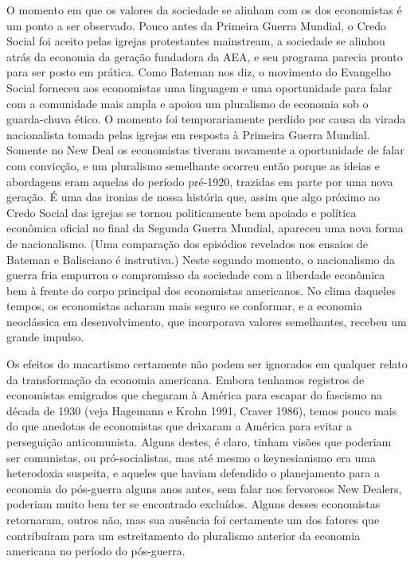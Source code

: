 \documentclass[a4paper,12pt]{article}[abntex2]
\begin{document}
O momento em que os valores da sociedade se alinham com os dos economistas é um ponto a ser observado. Pouco antes da Primeira Guerra Mundial, o Credo Social foi aceito pelas igrejas protestantes mainstream, a sociedade se alinhou atrás da economia da geração fundadora da AEA, e seu programa parecia pronto para ser posto em prática. Como Bateman nos diz, o movimento do Evangelho Social forneceu aos economistas uma linguagem e uma oportunidade para falar com a comunidade mais ampla e apoiou um pluralismo de economia sob o guarda-chuva ético. O momento foi temporariamente perdido por causa da virada nacionalista tomada pelas igrejas em resposta à Primeira Guerra Mundial. Somente no New Deal os economistas tiveram novamente a oportunidade de falar com convicção, e um pluralismo semelhante ocorreu então porque as ideias e abordagens eram aquelas do período pré-1920, trazidas em parte por uma nova geração. É uma das ironias de nossa história que, assim que algo próximo ao Credo Social das igrejas se tornou politicamente bem apoiado e política econômica oficial no final da Segunda Guerra Mundial, apareceu uma nova forma de nacionalismo. (Uma comparação dos episódios revelados nos ensaios de Bateman e Balisciano é instrutiva.) Neste segundo momento, o nacionalismo da guerra fria empurrou o compromisso da sociedade com a liberdade econômica bem à frente do corpo principal dos economistas americanos. No clima daqueles tempos, os economistas acharam mais seguro se conformar, e a economia neoclássica em desenvolvimento, que incorporava valores semelhantes, recebeu um grande impulso.

Os efeitos do macartismo certamente não podem ser ignorados em qualquer relato da transformação da economia americana. Embora tenhamos registros de economistas emigrados que chegaram à América para escapar do fascismo na década de 1930 (veja Hagemann e Krohn 1991, Craver 1986), temos pouco mais do que anedotas de economistas que deixaram a América para evitar a perseguição anticomunista. Alguns destes, é claro, tinham visões que poderiam ser comunistas, ou pró-socialistas, mas até mesmo o keynesianismo era uma heterodoxia suspeita, e aqueles que haviam defendido o planejamento para a economia do pós-guerra alguns anos antes, sem falar nos fervorosos New Dealers, poderiam muito bem ter se encontrado excluídos. Alguns desses economistas retornaram, outros não, mas sua ausência foi certamente um dos fatores que contribuíram para um estreitamento do pluralismo anterior da economia americana no período do pós-guerra.
\end{document}
